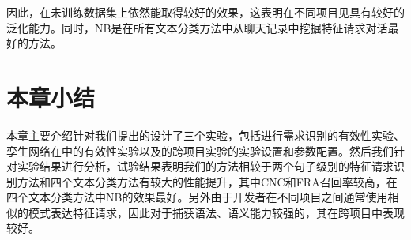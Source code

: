 因此，{\tool}在未训练数据集上依然能取得较好的效果，这表明{\tool}在不同项目见具有较好的泛化能力。同时，NB是在所有文本分类方法中从聊天记录中挖掘特征请求对话最好的方法。

\section{本章小结}

本章主要介绍针对我们提出的{\tool}设计了三个实验，包括{\tool}进行需求识别的有效性实验、孪生网络在{\tool}中的有效性实验以及{\tool}的跨项目实验的实验设置和参数配置。然后我们针对实验结果进行分析，试验结果表明我们的方法相较于两个句子级别的特征请求识别方法和四个文本分类方法有较大的性能提升，其中CNC和FRA召回率较高，在四个文本分类方法中NB的效果最好。另外由于开发者在不同项目之间通常使用相似的模式表达特征请求，因此对于捕获语法、语义能力较强的{\tool}，其在跨项目中表现较好。